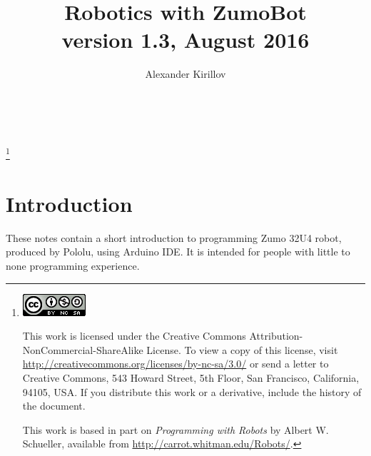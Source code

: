 \documentclass[oneside]{stml-l}
\numberwithin{figure}{chapter}
\begin{document}


\lstMakeShortInline~


\title[Robotics with ZumoBot]{Robotics with ZumoBot\\ {\small version 1.3, August 2016}}
\author{Alexander Kirillov}
\address{IslandBots robotic
club}
\maketitle
\thanks{
\vspace*{2in}
\noindent \centerline{\includegraphics{figures/cc-by-nc-sa.png}}

\noindent This work is licensed under the Creative Commons
Attribution-NonCommercial-ShareAlike License.  To view a copy of this
license, visit \url{http://creativecommons.org/licenses/by-nc-sa/3.0/} or
send a letter to Creative Commons, 543 Howard Street, 5th Floor, San
Francisco, California, 94105, USA. If you distribute this work or a
derivative, include the history of the document. 

\vspace{1in}

This work is based in part on {\em Programming with Robots} by 
Albert W. Schueller, available from
\url{http://carrot.whitman.edu/Robots/}. 
}


\tableofcontents
\chapter*{Introduction}
These notes contain a short introduction to programming Zumo 32U4 robot, produced by Pololu, using 
Arduino IDE. It is intended for people with little to none programming experience.  
\end{document}

